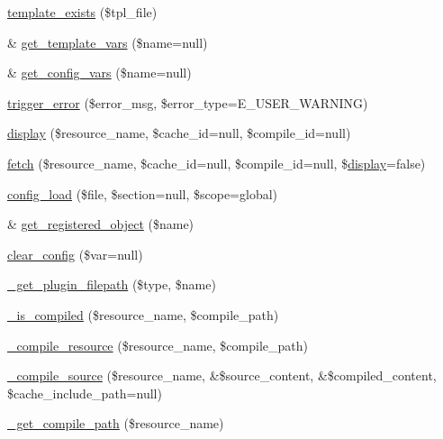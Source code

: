 \begin{DoxyCompactItemize}
\item 
\mbox{\hyperlink{class_smarty_a98d5eb5ae9a9c77a56d9ab142953eb16}{template\+\_\+exists}} (\$tpl\+\_\+file)
\item 
\& \mbox{\hyperlink{class_smarty_a15ee576f83199e9b824398c5f31ef39b}{get\+\_\+template\+\_\+vars}} (\$name=null)
\item 
\& \mbox{\hyperlink{class_smarty_a107cb2569db74865058df8908681ea02}{get\+\_\+config\+\_\+vars}} (\$name=null)
\item 
\mbox{\hyperlink{class_smarty_a92f740377d6a9b16164f0073194ff82d}{trigger\+\_\+error}} (\$error\+\_\+msg, \$error\+\_\+type=E\+\_\+\+U\+S\+E\+R\+\_\+\+W\+A\+R\+N\+I\+NG)
\item 
\mbox{\hyperlink{class_smarty_a94f4d4b9e64cb1da0617b88a294fd674}{display}} (\$resource\+\_\+name, \$cache\+\_\+id=null, \$compile\+\_\+id=null)
\item 
\mbox{\hyperlink{class_smarty_a1b5bd6ad8fc99feab1b5d0d2d55a4dc1}{fetch}} (\$resource\+\_\+name, \$cache\+\_\+id=null, \$compile\+\_\+id=null, \$\mbox{\hyperlink{class_smarty_a94f4d4b9e64cb1da0617b88a294fd674}{display}}=false)
\item 
\mbox{\hyperlink{class_smarty_a374046de7d17c7186747c97ca97b186b}{config\+\_\+load}} (\$file, \$section=null, \$scope=\textquotesingle{}global\textquotesingle{})
\item 
\& \mbox{\hyperlink{class_smarty_a07372bc11b894c18f9a085cf05d2a8b0}{get\+\_\+registered\+\_\+object}} (\$name)
\item 
\mbox{\hyperlink{class_smarty_a692797d43d2c50d1bf0430a44406c973}{clear\+\_\+config}} (\$var=null)
\item 
\mbox{\hyperlink{class_smarty_a5e3e1de75662305f3e2b08f536ed1918}{\+\_\+get\+\_\+plugin\+\_\+filepath}} (\$type, \$name)
\item 
\mbox{\hyperlink{class_smarty_a0e8988bcee20ab98d5c15e418871bc87}{\+\_\+is\+\_\+compiled}} (\$resource\+\_\+name, \$compile\+\_\+path)
\item 
\mbox{\hyperlink{class_smarty_a920b3e80a2cc5713250fbb7dec5f23fc}{\+\_\+compile\+\_\+resource}} (\$resource\+\_\+name, \$compile\+\_\+path)
\item 
\mbox{\hyperlink{class_smarty_a85d46cb26200394af2a815fbcc0531eb}{\+\_\+compile\+\_\+source}} (\$resource\+\_\+name, \&\$source\+\_\+content, \&\$compiled\+\_\+content, \$cache\+\_\+include\+\_\+path=null)
\item 
\mbox{\hyperlink{class_smarty_a3a54fc13f42eb7d6363d32bbf783cc1a}{\+\_\+get\+\_\+compile\+\_\+path}} (\$resource\+\_\+name)

\end{DoxyCompactItemize}
